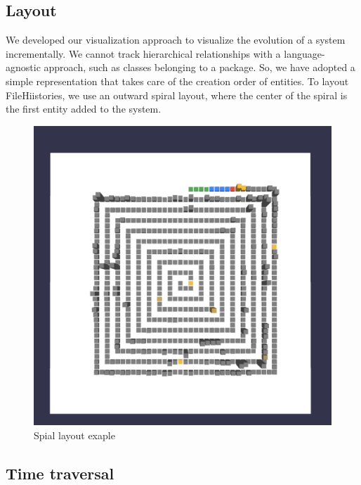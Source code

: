\subsection*{Layout}
We developed our visualization approach to visualize the evolution of a system incrementally. 
We cannot track hierarchical relationships with a language-agnostic approach, such as classes belonging to a package. 
So, we have adopted a simple representation that takes care of the creation order of entities.
To layout FileHiistories, we use an outward spiral layout, where the center of the spiral is the first entity added to the system. 

\begin{figure}
    \center
    \includegraphics[width=\textwidth]{Layout.png}
    \caption{Spial layout exaple}
    \label{fig:layout}
\end{figure}


\subsection*{Time traversal}

